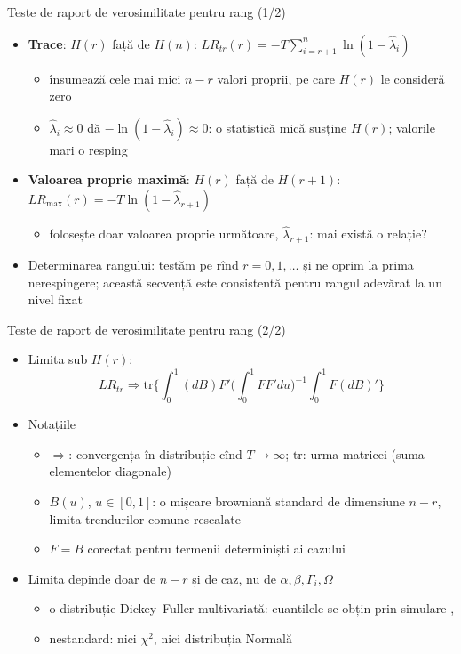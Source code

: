 \begin{frame}{Teste de raport de verosimilitate pentru rang (1/2)}
\itemsize{\small}
\begin{itemize}
    \item \textbf{Trace}: $H(r)$ față de $H(n)$: $LR_{tr}(r) = -T\sum_{i=r+1}^{n}\ln(1 - \hat\lambda_i)$
    \begin{itemize}
        \item însumează cele mai mici $n - r$ valori proprii, pe care $H(r)$ le consideră zero
        \item $\hat\lambda_i \approx 0$ dă $-\ln(1 - \hat\lambda_i) \approx 0$: o statistică mică susține $H(r)$; valorile mari o resping
    \end{itemize}
    \item \textbf{Valoarea proprie maximă}: $H(r)$ față de $H(r + 1)$: $LR_{\max}(r) = -T\ln(1 - \hat\lambda_{r+1})$
    \begin{itemize}
        \item folosește doar valoarea proprie următoare, $\hat\lambda_{r+1}$: mai există o relație?
    \end{itemize}
    \item Determinarea rangului: testăm pe rînd $r = 0, 1, \dots$ și ne oprim la prima nerespingere; această secvență este consistentă pentru rangul adevărat la un nivel fixat 
\end{itemize}
\end{frame}

\begin{frame}{Teste de raport de verosimilitate pentru rang (2/2)}
\itemsize{\small}
\begin{itemize}
    \item Limita sub $H(r)$: \[ LR_{tr} \Rightarrow \mathrm{tr}\Big\{\int_0^1 (dB)F'\Big(\int_0^1 FF'du\Big)^{-1}\int_0^1 F(dB)'\Big\} \]
    \item Notațiile
    \begin{itemize}
        \item $\Rightarrow$: convergența în distribuție cînd $T \to \infty$; $\mathrm{tr}$: urma matricei (suma elementelor diagonale)
        \item $B(u)$, $u \in [0, 1]$: o mișcare browniană standard de dimensiune $n - r$, limita trendurilor comune rescalate
        \item $F = B$ corectat pentru termenii determiniști ai cazului
    \end{itemize}
    \item Limita depinde doar de $n - r$ și de caz, nu de $\alpha, \beta, \Gamma_i, \Omega$
    \begin{itemize}
        \item o distribuție Dickey--Fuller multivariată: cuantilele se obțin prin simulare , 
        \item nestandard: nici $\chi^2$, nici distribuția Normală
    \end{itemize}
\end{itemize}
\end{frame}


